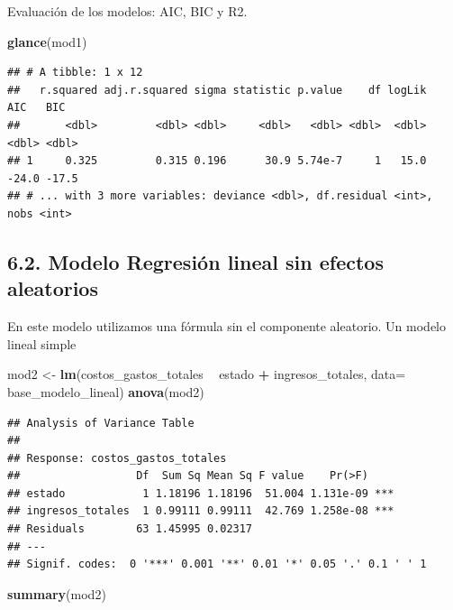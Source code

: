\documentclass[
  11pt,
  a4paper,
]{book}
\newenvironment{Shaded}{\begin{snugshade}}{\end{snugshade}}
\newcommand{\DataTypeTok}[1]{\textcolor[rgb]{0.13,0.29,0.53}{#1}}
\newcommand{\KeywordTok}[1]{\textcolor[rgb]{0.13,0.29,0.53}{\textbf{#1}}}
\newcommand{\NormalTok}[1]{#1}
\newcommand{\OperatorTok}[1]{\textcolor[rgb]{0.81,0.36,0.00}{\textbf{#1}}}
\newcommand{\StringTok}[1]{\textcolor[rgb]{0.31,0.60,0.02}{#1}}
\begin{document}
Evaluación de los modelos: AIC, BIC y R2.

\begin{Shaded}
\begin{Highlighting}[]
\KeywordTok{glance}\NormalTok{(mod1)}
\end{Highlighting}
\end{Shaded}

\begin{verbatim}
## # A tibble: 1 x 12
##   r.squared adj.r.squared sigma statistic p.value    df logLik   AIC   BIC
##       <dbl>         <dbl> <dbl>     <dbl>   <dbl> <dbl>  <dbl> <dbl> <dbl>
## 1     0.325         0.315 0.196      30.9 5.74e-7     1   15.0 -24.0 -17.5
## # ... with 3 more variables: deviance <dbl>, df.residual <int>, nobs <int>
\end{verbatim}

\hypertarget{modelo-regresiuxf3n-lineal-sin-efectos-aleatorios}{%
\subsection{6.2. Modelo Regresión lineal sin efectos
aleatorios}\label{modelo-regresiuxf3n-lineal-sin-efectos-aleatorios}}

En este modelo utilizamos una fórmula sin el componente aleatorio. Un
modelo lineal simple

\begin{Shaded}
\begin{Highlighting}[]
\NormalTok{mod2 <-}\StringTok{ }\KeywordTok{lm}\NormalTok{(costos_gastos_totales }\OperatorTok{~}\StringTok{ }\NormalTok{estado }\OperatorTok{+}\StringTok{ }\NormalTok{ingresos_totales, }
           \DataTypeTok{data=}\NormalTok{ base_modelo_lineal) }
\KeywordTok{anova}\NormalTok{(mod2)}
\end{Highlighting}
\end{Shaded}

\begin{verbatim}
## Analysis of Variance Table
## 
## Response: costos_gastos_totales
##                  Df  Sum Sq Mean Sq F value    Pr(>F)    
## estado            1 1.18196 1.18196  51.004 1.131e-09 ***
## ingresos_totales  1 0.99111 0.99111  42.769 1.258e-08 ***
## Residuals        63 1.45995 0.02317                      
## ---
## Signif. codes:  0 '***' 0.001 '**' 0.01 '*' 0.05 '.' 0.1 ' ' 1
\end{verbatim}

\begin{Shaded}
\begin{Highlighting}[]
\KeywordTok{summary}\NormalTok{(mod2)}
\end{Highlighting}
\end{Shaded}
\end{document}
